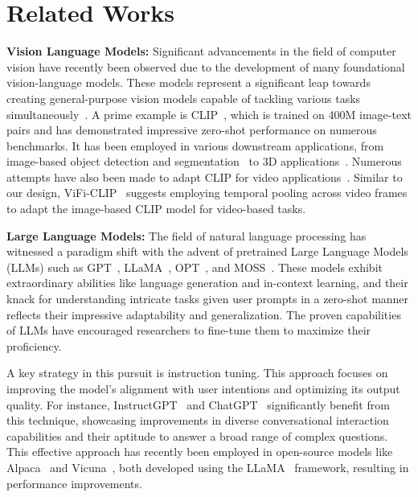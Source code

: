 \section{Related Works}

\textbf{Vision Language Models:} Significant advancements in the field of computer vision have recently been observed due to the development of many foundational vision-language models. These models represent a significant leap towards creating general-purpose vision models capable of tackling various tasks simultaneously~\cite{radford2021learning, Alayrac2022Flamingo, gupta2022towards, Maaz2022Multimodal}. A prime example is CLIP~\cite{radford2021learning}, which is trained on 400M image-text pairs and has demonstrated impressive zero-shot performance on numerous benchmarks. It has been employed in various downstream applications, from image-based object detection and segmentation~\cite{Hanoona2022Bridging, liang2023open} to 3D applications~\cite{rozenberszki2022language, ni2022expanding}. Numerous attempts have also been made to adapt CLIP for video applications~\cite{wang2021actionclip, ni2022expanding}. Similar to our design, ViFi-CLIP~\cite{hanoonavificlip} suggests employing temporal pooling across video frames to adapt the image-based CLIP model for video-based tasks.

\noindent \textbf{Large Language Models:} The field of natural language processing has witnessed a paradigm shift with the advent of pretrained Large Language Models (LLMs) such as GPT~\cite{brown2020languagegpt}, LLaMA~\cite{touvron2023llama}, OPT~\cite{zhang2022opt}, and MOSS~\cite{OpenLMLab_2023}. These models exhibit extraordinary abilities like language generation and in-context learning, and their knack for understanding intricate tasks given user prompts in a zero-shot manner reflects their impressive adaptability and generalization. The proven capabilities of LLMs have encouraged researchers to fine-tune them to maximize their proficiency.

A key strategy in this pursuit is instruction tuning. This approach focuses on improving the model's alignment with user intentions and optimizing its output quality. For instance, InstructGPT~\cite{ouyang2022traininginstructgpt} and ChatGPT~\cite{chatgpt} significantly benefit from this technique, showcasing improvements in diverse conversational interaction capabilities and their aptitude to answer a broad range of complex questions. This effective approach has recently been employed in open-source models like Alpaca~\cite{alpaca} and Vicuna~\cite{vicuna2023}, both developed using the LLaMA~\cite{touvron2023llama} framework, resulting in performance improvements.

